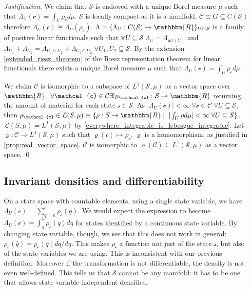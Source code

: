 \documentclass[aps,pra,10pt,twocolumn,floatfix,nofootinbib]{revtex4-1}
\numberwithin{equation}{section}
\theoremstyle{definition}
\newenvironment{justification}{\emph{Justification}.}{\qed}
\begin{document}
\begin{justification}
	We claim that $\mathcal{S}$ is endowed with a unique Borel measure $\mu$ such that $\Lambda_U (\mathcal{c}) = \int_U \rho_{\mathcal{c}} d \mu$.  $\mathcal{S}$ is locally compact as it is a manifold. $\mathcal{C} \cong G \subseteq C(\mathcal{S})$ therefore $\Lambda_U(\mathcal{c}) \cong \Lambda_U(\rho_\mathcal{c})$. $\Lambda = \{\Lambda_U : C(\mathcal{S}) \rightarrow \mathbbm{R}\}_{U \subseteq \mathcal{S}}$ is a family of positive linear functionals such that $\forall U \subseteq \mathcal{S} \; \Lambda_U = \Lambda_{\mathrm{int}(U)}$ and $\Lambda_{U_1} + \Lambda_{U_2} = \Lambda_{U_1 \cup U_2} + \Lambda_{U_1 \cap U_2} \; \forall U_1, U_2 \subseteq \mathcal{S}$. By the extension \ref{extended_riesz_theorem} of the Riesz representation theorem for linear functionals 
	there exists a unique Borel measure $\mu$ such that $\Lambda_U (\mathcal{c}) = \int_{U} \rho_\mathcal{c} d\mu$.

	We claim $\mathcal{C}$ is isomorphic to a subspace of $L^1(\mathcal{S}, \mu)$ as a vector space over $\mathbbm{R}$. $\forall \mathcal{c} \in \mathcal{C} \exists ! \rho_{\mathcal{c}}:\mathcal{S} \rightarrow \mathbbm{R}$ returning the amount of material for each state $\mathcal{s} \in \mathcal{S}$. As $|\Lambda_{U}(\mathcal{c})| < \infty \; \forall \mathcal{c} \in \mathcal{C} \; \forall U \subseteq \mathcal{S}$, then $\rho_{\mathcal{c}} \in \mathcal{L}(S,\mu) \equiv \{ \rho : S \rightarrow \mathbbm{R} \; | \;\; |\int_{U} \rho d\mu| < \infty \; \forall U \subseteq S\}$. $\mathcal{L}(S,\mu) = L^1(\mathcal{S}, \mu)$ by \ref{everywhere_integrable_is_lebesgue_integrable}. Let $\varrho : \mathcal{C} \rightarrow L^1(\mathcal{S}, \mu)$ such that $\varrho(\mathcal{c}) \mapsto \rho_\mathcal{c}$. $\varrho$ is a homomorphism, as justified in \ref{prop:real_vector_space}. $\mathcal{C}$ is isomorphic to $\varrho(\mathcal{C}) \subseteq L^1(\mathcal{S}, \mu)$ as a vector space.
\end{justification}

\subsection{Invariant densities and differentiability}

On a state space with countable elements, using a single state variable, we have $\Lambda_U (\mathcal{c}) = \sum \limits_{q=a}^b \rho_\mathcal{c}(q)$. We would expect the expression to become $\Lambda_U (\mathcal{c}) = \int_a^b \rho_\mathcal{c} (q) dq$ for states identified by a continuous state variable. By changing state variable, though, we see that this does not work in general: $\rho_\mathcal{c}(\hat{q})= \rho_\mathcal{c}(q) dq/d\hat{q}$. This makes $\rho_\mathcal{c}$ a function not just of the state $\mathcal{s}$, but also of the state variables we are using. This is inconsistent with our previous definition. Moreover if the transformation is not differentiable, the density is not even well-defined. This tells us that $\mathcal{S}$ cannot be any manifold: it has to be one that allows state-variable-independent densities.
\end{document}
